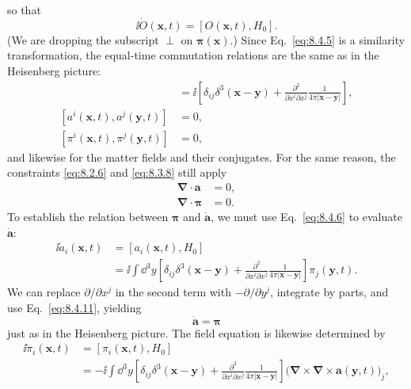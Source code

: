 so that
\begin{equation}
\ii\dot O(\mathbf x,t)=[O(\mathbf x,t),H_0].
\tag{8.4.6}\label{eq:8.4.6}
\end{equation}
(We are dropping the subscript $\perp$ on $\boldsymbol\pi(\mathbf x)$.) Since
Eq.~\eqref{eq:8.4.5} is a similarity transformation, the equal-time commutation
relations are the same as in the Heisenberg picture:
\begin{align}
[a^i(\mathbf x,t),\pi^j(\mathbf y,t)]
&=\ii\left[\delta_{ij}\delta^3(\mathbf x-\mathbf y)
 +\frac{\partial^2}{\partial x^i\partial x^j}
  \frac{1}{4\pi\lvert\mathbf x-\mathbf y\rvert}\right],
\tag{8.4.7}\label{eq:8.4.7}\\
[a^i(\mathbf x,t),a^j(\mathbf y,t)]&=0,
\tag{8.4.8}\label{eq:8.4.8}\\
[\pi^i(\mathbf x,t),\pi^j(\mathbf y,t)]&=0,
\tag{8.4.9}\label{eq:8.4.9}
\end{align}
and likewise for the matter fields and their conjugates. For the same reason,
the constraints \eqref{eq:8.2.6} and \eqref{eq:8.3.8} still apply
\begin{align}
\boldsymbol\nabla\cdot\mathbf a&=0,
\tag{8.4.10}\label{eq:8.4.10}\\
\boldsymbol\nabla\cdot\boldsymbol\pi&=0.
\tag{8.4.11}\label{eq:8.4.11}
\end{align}
To establish the relation between $\boldsymbol\pi$ and $\dot{\mathbf a}$, we
must use Eq.~\eqref{eq:8.4.6} to evaluate $\dot{\mathbf a}$:
\begin{align*}
\ii\dot a_i(\mathbf x,t)
&=[a_i(\mathbf x,t),H_0]\\
&=\ii\int \dd^3y\left[
  \delta_{ij}\delta^3(\mathbf x-\mathbf y)
  +\frac{\partial^2}{\partial x^i\partial x^j}
   \frac{1}{4\pi\lvert\mathbf x-\mathbf y\rvert}
  \right]\pi_j(\mathbf y,t).
\end{align*}
We can replace $\partial/\partial x^j$ in the second term with
$-\partial/\partial y^j$, integrate by parts, and use Eq.~\eqref{eq:8.4.11}, yielding
\begin{equation}
\dot{\mathbf a}=\boldsymbol\pi
\tag{8.4.12}\label{eq:8.4.12}
\end{equation}
just as in the Heisenberg picture. The field equation is likewise determined
by
\begin{align*}
\ii\dot\pi_i(\mathbf x,t)
&=[\pi_i(\mathbf x,t),H_0]\\
&=-\ii\int \dd^3y\left[
  \delta_{ij}\delta^3(\mathbf x-\mathbf y)
  +\frac{\partial^2}{\partial x^i\partial x^j}
   \frac{1}{4\pi\lvert\mathbf x-\mathbf y\rvert}
  \right]
  \bigl(\boldsymbol\nabla\times\boldsymbol\nabla\times
        \mathbf a(\mathbf y,t)\bigr)_j,
\end{align*}
